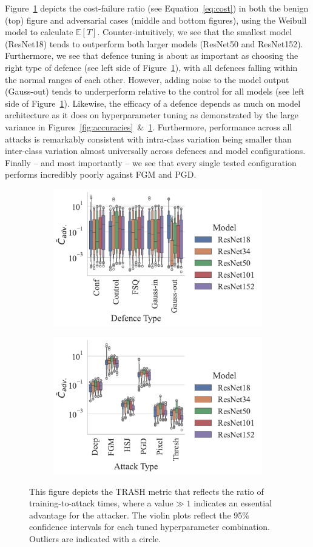 Figure~\ref{fig:failures_per_train_time} depicts the cost-failure ratio (see Equation~\ref{eq:cost}) in both the benign (top) figure and adversarial cases (middle and bottom figures), using the Weibull model to calculate $\mathbb{E}[T]$. Counter-intuitively, we see that the smallest model (ResNet18) tends to outperform both larger models (ResNet50 and ResNet152). Furthermore, we see that defence tuning is about as important as choosing the right type of defence (see left side of Figure~\ref{fig:failures_per_train_time}), with all defences falling within the normal ranges of each other. However, adding noise to the model output (Gauss-out) tends to underperform relative to the control for all models (see left side of Figure~\ref{fig:failures_per_train_time}). Likewise, the efficacy of a defence depends as much on model architecture as it does on hyperparameter tuning as demonstrated by the large variance in Figures~\ref{fig:accuracies}~\&~\ref{fig:failures_per_train_time}.  Furthermore, performance across all attacks is remarkably consistent with intra-class variation being smaller than inter-class variation almost universally across defences and model configurations.
Finally -- and most importantly -- we see that every single tested configuration performs incredibly poorly against FGM and PGD\@.

\begin{figure}[!h]
    \centering
    \begin{subfigure}
        \centering
        \includegraphics[width=.38\textwidth,trim={12pt 10pt 20pt 10pt},clip]{plots/trash_score_vs_defence_type.pdf}
    \end{subfigure}
    \begin{subfigure}
        \centering
        \includegraphics[width=.38\textwidth,trim={12pt 10pt 20pt 10pt},clip]{plots/trash_score_vs_attack_type.pdf}
    \end{subfigure}
    \caption{This figure depicts the TRASH metric that reflects the ratio of training-to-attack times, where a value$\gg 1 $  indicates an essential advantage for the attacker. The violin plots reflect the 95\% confidence intervals for each tuned hyperparameter combination. Outliers are indicated with a circle.}
	\label{fig:failures_per_train_time}
\end{figure}